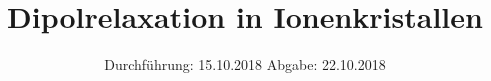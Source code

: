 

\subject{48}
\title{Dipolrelaxation in Ionenkristallen}
\date{
  Durchführung: 15.10.2018
  \hspace{3em}
  Abgabe: 22.10.2018
}



\maketitle
\thispagestyle{empty}
\tableofcontents
\newpage
\setcounter{page}{1}




\appendix

\printbibliography


